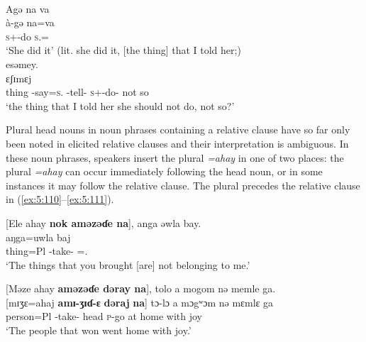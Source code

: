 \ea \label{ex:5:109}\\
Agə na  va   \\
\gll  à-gə  na=va    \\
      \textsc{s}+{\PFV}-do     \textsc{s}.{\DO}={\PRF}   \\
\glt ‘She did it’ (lit. she did it, [the thing] that I told her;)\\
      
  esəmey.\\
\gll  [ɛlɛ     \textbf{nɛ} \textbf{ama-h=aŋ}   \textbf{Ø}  \textbf{amɪ-dʒ-ijɛ} {\textbar}\textbf{m\`{ɛ}-g-ɛ} \textbf{Ø} \textbf{baj}{\textbar} \textbf{na}] ɛʃɪmɛj\\
      thing   {\oneS}     {\DEP}-say=\textsc{s}.{\IO}  { }  {\DEP}-tell-{\CL}    \textsc{s}+{\HOR}-do-{\CL} { } {\NEG}    {\PSP}    {not so}\\
\glt  ‘the thing that I told her she should not do, not so?’ 
\z

Plural head nouns in noun phrases containing a relative clause have so far only been noted in elicited relative clauses and their interpretation is ambiguous. In these noun phrases, speakers insert the plural \textit{=ahay}  in one of two places: the plural \textit{=ahay} can occur immediately following the head noun, or in some instances it may follow the relative clause. The plural precedes the relative clause in (\ref{ex:5:110}--\ref{ex:5:111}). 

\ea \label{ex:5:110}
{}[Ele  ahay  \textbf{nok  aməzəɗe  na}],  anga  əwla  bay.\\
\gll  [ɛlɛ=ahaj  \textbf{nɔkʷ} \textbf{amɪ-ʒɪɗ-ɛ}   \textbf{na}]  aŋga=uwla    baj\\
      thing=Pl  {\twoS}  {\DEP}-take-{\CL}  {\PSP}  {\POSS}={\oneS}.{\POSS}  {\NEG}\\
\glt  ‘The things that you brought [are] not belonging to me.’
\z

\ea \label{ex:5:111}
{}[Məze  ahay  \textbf{aməzəɗe  dəray  na}],  tolo  a  mogom  nə  memle  ga.\\
\gll  {}[mɪʒɛ=ahaj  \textbf{amɪ-ʒɪɗ{}-ɛ} \textbf{dəraj}  \textbf{na}]  tɔ-lɔ  a  mɔgʷɔm  nə  mɛmlɛ  ga\\
      person=Pl  {\DEP}-take{}-{\CL}  head  {\PSP}  \textsc{p}-go  at  home  with  joy  {\ADJ}\\
\glt  ‘The people that won went home with joy.’
\z

